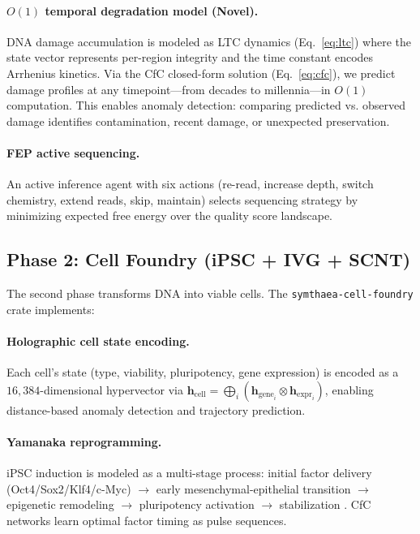 \documentclass[11pt,letterpaper]{article}
\newcommand{\hv}{\mathbf{h}}
\newcommand{\bind}{\otimes}
\newcommand{\dimHDC}{16{,}384}
\begin{document}
\paragraph{$O(1)$ temporal degradation model (Novel).} DNA damage accumulation
is modeled as LTC dynamics (Eq.~\ref{eq:ltc}) where the state vector represents
per-region integrity and the time constant encodes Arrhenius kinetics. Via the
CfC closed-form solution (Eq.~\ref{eq:cfc}), we predict damage profiles at any
timepoint---from decades to millennia---in $O(1)$ computation. This enables
anomaly detection: comparing predicted vs. observed damage identifies
contamination, recent damage, or unexpected preservation.

\paragraph{FEP active sequencing.} An active inference agent with six actions
(re-read, increase depth, switch chemistry, extend reads, skip, maintain)
selects sequencing strategy by minimizing expected free energy over the
quality score landscape.

\subsection{Phase 2: Cell Foundry (iPSC + IVG + SCNT)}

The second phase transforms DNA into viable cells. The
\texttt{symthaea-cell-foundry} crate implements:

\paragraph{Holographic cell state encoding.} Each cell's state (type, viability,
pluripotency, gene expression) is encoded as a $\dimHDC$-dimensional
hypervector via $\hv_\text{cell} = \bigoplus_i (\hv_\text{gene}_i \bind
\hv_\text{expr}_i)$, enabling distance-based anomaly detection and trajectory
prediction.

\paragraph{Yamanaka reprogramming.} iPSC induction is modeled as a multi-stage
process: initial factor delivery (Oct4/Sox2/Klf4/c-Myc) $\rightarrow$ early
mesenchymal-epithelial transition $\rightarrow$ epigenetic remodeling
$\rightarrow$ pluripotency activation $\rightarrow$ stabilization
\cite{takahashi2006induction}. CfC networks learn optimal factor timing as
pulse sequences.
\end{document}
